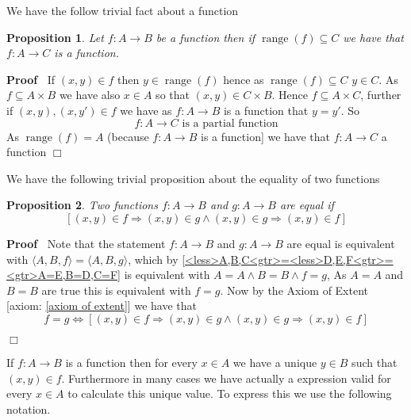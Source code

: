 \documentclass{book}
\newcommand{\tmop}[1]{\ensuremath{\operatorname{#1}}}
\newenvironment{proof}{\noindent\textbf{Proof\ }}{\hspace*{\fill}$\Box$\medskip}
\newtheorem{proposition}{Proposition}
{\theorembodyfont{\rmfamily}\newtheorem{remark}{Remark}}
\begin{document}
We have the follow trivial fact about a function

\begin{proposition}
  \label{function range restriction}Let $f : A \rightarrow B$ be a function
  then if $\tmop{range} (f) \subseteq C$ we have that $f : A \rightarrow C$ is
  a function.
\end{proposition}

\begin{proof}
  If $(x, y) \in f$ then $y \in \tmop{range} (f)$ hence as $\tmop{range} (f)
  \subseteq C$ $y \in C$. As $f \subseteq A \times B$ we have also $x \in A$
  so that $(x, y) \in C \times B$. Hence $f \subseteq A \times C$, further if
  $(x, y), (x, y') \in f$ we have as $f : A \rightarrow B$ is a function that
  $y = y'$. So
  \[ f : A \rightarrow C \text{ is a partial function} \]
  As $\tmop{range} (f) = A$ (because $f : A \rightarrow B$ is a function] we
  have that $f : A \rightarrow C$ a function
\end{proof}

We have the following trivial proposition about the equality of two functions

\begin{proposition}
  \label{function equality (1)}Two functions $f : A \rightarrow B$ and $g : A
  \rightarrow B$ are equal if
  \[ [(x, y) \in f \Rightarrow (x, y) \in g \wedge (x, y) \in g \Rightarrow
     (x, y) \in f] \]
\end{proposition}

\begin{proof}
  Note that the statement $f : A \rightarrow B$ and $g : A \rightarrow B$ are
  equal is equivalent with $\langle A, B, f \rangle = \langle A, B, g
  \rangle$, which by \ref{<less>A,B,C<gtr>=<less>D,E,F<gtr>=<gtr>A=E,B=D,C=F}
  is equivalent with $A = A \wedge B = B \wedge f = g$, As $A = A$ and $B = B$
  are true this is equivalent with $f = g$. Now by the Axiom of Extent [axiom:
  \ref{axiom of extent}] we have that
  \[ f = g \Leftrightarrow [(x, y) \in f \Rightarrow (x, y) \in g \wedge (x,
     y) \in g \Rightarrow (x, y) \in f] \]
  
\end{proof}

If $f : A \rightarrow B$ is a function then for every $x \in A$ we have a
unique $y \in B$ such that $(x, y) \in f$. Furthermore in many cases we have
actually a expression valid for every $x \in A$ to calculate this unique
value. To express this we use the following notation.
\end{document}
